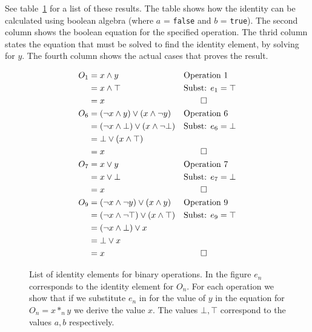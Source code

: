\documentclass{amsart}
\newcommand{\ltrue}{\top}
\newcommand{\lfalse}{\bot}
\begin{document}
\begin{enumerate}
   See table~\ref{fig:bool_ids} for a list of these results. The table shows
   how the identity can be calculated using boolean algebra (where $a$ =
   \verb=false= and $b$ = \verb=true=). The second column shows the boolean
   equation for the specified operation. The thrid column states the 
   equation that must be solved to find the identity element, by solving
   for $y$. The fourth column shows the actual cases that proves the result.
   \begin{figure}
      \caption{List of identity elements for binary operations. In the figure
      $e_n$ corresponds to the identity element for $O_n$. For each operation
      we show that if we substitute $e_n$ in for the value of $y$ in the 
      equation for $O_n = x *_n y$ we derive the value $x$. The values
      $\lfalse, \ltrue$ correspond to the values $a, b$ respectively.}
      \label{fig:bool_ids}
      \begin{align*}
      O_1&=  x \land y  && \text{Operation 1}    \\
	 & = x \land \ltrue  && \text{Subst: } e_1 = \ltrue \\
	 & = x               && \qed                  \\
      O_6& = (\lnot x \land y) \lor (x \land \lnot y)
	                     && \text{Operation 6}    \\
	 & = (\lnot x \land \lfalse) \lor (x \land \lnot \lfalse)
	                     && \text{Subst: } e_6 = \lfalse \\
	 & = \lfalse \lor (x \land \ltrue)            \\
	 & = x               && \qed                  \\
      O_7& = x \lor y    && \text{Operation 7}    \\
	 & = x \lor \lfalse  && \text{Subst: } e_7 = \lfalse\\
	 & = x               && \qed                  \\
      O_9& = (\lnot x \land \lnot y) \lor (x \land y)
	                     && \text{Operation 9}    \\
	 & = (\lnot x \land \lnot \ltrue) \lor (x \land \ltrue)
	                     && \text{Subst: } e_9 = \ltrue \\
	 & = (\lnot x \land \lfalse) \lor x           \\
	 & = \lfalse \lor x                           \\
	 & = x               && \qed
      \end{align*}
   \end{figure}

\end{enumerate}
\end{document}
